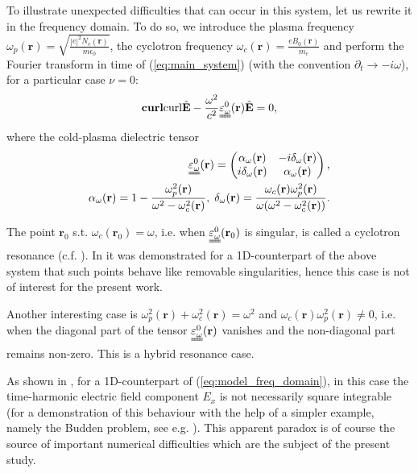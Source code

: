 {To illustrate unexpected difficulties that can occur in this system, let us rewrite it in the frequency domain. To do so, 
we introduce the plasma frequency $\omega_p(\mathbf{r})=\sqrt{\frac{|e|^2N_e(\mathbf{r})}{m\epsilon_0}}$, 
the cyclotron frequency $\omega_c(\mathbf{r})=\frac{e B_0(\mathbf{r})}{m_e}$ and perform the Fourier transform 
in time of (\ref{eq:main_system}) (with the convention $\partial_t\rightarrow -i\omega$), for a 
particular case $\nu=0$:
\begin{align}
\label{eq:model_freq_domain}
 \mathbf{curl}{\operatorname{curl}}\hat{\mathbf{E}}-\frac{\omega^2}{c^2}\uuline{\varepsilon_{\omega}^{0}}(\mathbf{r})\hat{\mathbf{E}}=0,
\end{align}
where the cold-plasma dielectric tensor \cite[Chapter 1-2]{Stix}
\begin{align}
\nonumber
\uuline{\varepsilon_{\omega}^{0}}(\mathbf{r})=\left(
 \begin{matrix}
  \alpha_{\omega}(\mathbf{r})& -i\delta_{\omega}(\mathbf{r})\\
  i\delta_{\omega}(\mathbf{r}) & \alpha_{\omega}(\mathbf{r})
 \end{matrix}
\right),\\
\label{eq:alpha_delta}
\alpha_{\omega}(\mathbf{r})=1-\frac{\omega_p^2(\mathbf{r})}{\omega^2-\omega_c^2(\mathbf{r})},\; \delta_{\omega}(\mathbf{r})=\frac{\omega_c(\mathbf{r})\omega_p^2(\mathbf{r})}{\omega(\omega^2-\omega_c^2(\mathbf{r}))}.
\end{align}

The point $\mathbf{r}_0$ s.t. $\omega_c(\mathbf{r}_0)=\omega$, i.e. when $\uuline{\varepsilon_{\omega}^{0}}(\mathbf{r}_0)$ is singular, is called a cyclotron resonance (c.f. \cite[Chapter 1-5]{Stix}). 
In \cite{singular_solutions} it was demonstrated for a 1D-counterpart of the above system that such points behave like removable singularities, 
hence this case is not of interest for the present work. 

Another interesting case is $\omega_p^2(\mathbf{r})+\omega_c^2(\mathbf{r})=\omega^2$ and $\omega_c(\mathbf{r})\omega_p^2(\mathbf{r})\neq 0$, i.e. when the diagonal part of the tensor 
$\uuline{\varepsilon_{\omega}^{0}}(\mathbf{r})$ vanishes and the non-diagonal part remains non-zero. This is a hybrid resonance case. 

As shown in \cite{Despres_2014, singular_solutions}, for a 1D-counterpart of (\ref{eq:model_freq_domain}), in this case the time-harmonic electric field component $E_x$ is not necessarily square 
integrable (for a demonstration of this behaviour with the help of a simpler example, namely the Budden problem, see e.g. \cite{Despres_2014}). 
This apparent paradox is of course the source of important numerical difficulties which are the subject of the present study. 


}
